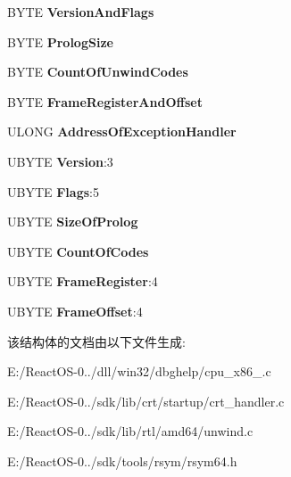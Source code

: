 \begin{DoxyCompactItemize}
B\+Y\+TE {\bfseries Version\+And\+Flags}
\item 
\mbox{\label{struct___u_n_w_i_n_d___i_n_f_o_ad54cb92bd578946237316d8a1e966753}} 
B\+Y\+TE {\bfseries Prolog\+Size}
\item 
\mbox{\label{struct___u_n_w_i_n_d___i_n_f_o_a40bbfbe12e434b95fc287f889100bb29}} 
B\+Y\+TE {\bfseries Count\+Of\+Unwind\+Codes}
\item 
\mbox{\label{struct___u_n_w_i_n_d___i_n_f_o_ab72620ad52edaf63e2a4ac58aba9abbd}} 
B\+Y\+TE {\bfseries Frame\+Register\+And\+Offset}
\item 
\mbox{\label{struct___u_n_w_i_n_d___i_n_f_o_abe6fe394a3cf4321d0e9a13a8299bf90}} 
U\+L\+O\+NG {\bfseries Address\+Of\+Exception\+Handler}
\item 
\mbox{\label{struct___u_n_w_i_n_d___i_n_f_o_a7b3c07c23bbce04a602daf6a5cfe7fc3}} 
U\+B\+Y\+TE {\bfseries Version}\+:3
\item 
\mbox{\label{struct___u_n_w_i_n_d___i_n_f_o_ae1addf0d2eb5fca6a5ff29eea960144b}} 
U\+B\+Y\+TE {\bfseries Flags}\+:5
\item 
\mbox{\label{struct___u_n_w_i_n_d___i_n_f_o_ab03b6de594514f833af3669dbff34fdc}} 
U\+B\+Y\+TE {\bfseries Size\+Of\+Prolog}
\item 
\mbox{\label{struct___u_n_w_i_n_d___i_n_f_o_a38288c11c95873f281a741979d636b87}} 
U\+B\+Y\+TE {\bfseries Count\+Of\+Codes}
\item 
\mbox{\label{struct___u_n_w_i_n_d___i_n_f_o_a4231b97ed2c03648960d413835ac86e5}} 
U\+B\+Y\+TE {\bfseries Frame\+Register}\+:4
\item 
\mbox{\label{struct___u_n_w_i_n_d___i_n_f_o_ae022c245096de723ddce2960d8be6bed}} 
U\+B\+Y\+TE {\bfseries Frame\+Offset}\+:4
\end{DoxyCompactItemize}


该结构体的文档由以下文件生成\+:\begin{DoxyCompactItemize}
\item 
E\+:/\+React\+O\+S-\/0../dll/win32/dbghelp/cpu\+\_\+x86\+\_.\+c\item 
E\+:/\+React\+O\+S-\/0../sdk/lib/crt/startup/crt\+\_\+handler.\+c\item 
E\+:/\+React\+O\+S-\/0../sdk/lib/rtl/amd64/unwind.\+c\item 
E\+:/\+React\+O\+S-\/0../sdk/tools/rsym/rsym64.\+h\end{DoxyCompactItemize}
